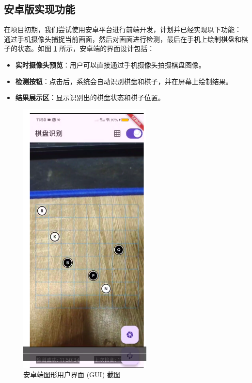 \documentclass[12pt, a4paper]{article}
\begin{document}
\subsection{安卓版实现功能}
在项目初期，我们尝试使用安卓平台进行前端开发，计划并已经实现以下功能：
通过手机摄像头捕捉当前画面，然后对画面进行检测，最后在手机上绘制棋盘和棋子的状态。如图 \ref{fig:android} 所示，安卓端的界面设计包括：
\begin{itemize}
    \item \textbf{实时摄像头预览}：用户可以直接通过手机摄像头拍摄棋盘图像。
    \item \textbf{检测按钮}：点击后，系统会自动识别棋盘和棋子，并在屏幕上绘制结果。
    \item \textbf{结果展示区}：显示识别出的棋盘状态和棋子位置。
\end{itemize}
\begin{figure}[h!]
    \centering
    \includegraphics[width=0.6\textwidth]{image/android_gui.jpg} 
    \caption{安卓端图形用户界面 (GUI) 截图}
    \label{fig:android}
\end{figure}
\end{document}
